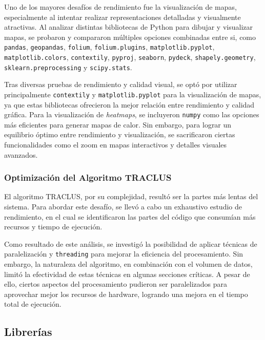 Uno de los mayores desafíos de rendimiento fue la visualización de mapas, especialmente al intentar realizar representaciones detalladas y visualmente atractivas. Al analizar distintas bibliotecas de Python para dibujar y visualizar mapas, se probaron y compararon múltiples opciones combinadas entre si, como \texttt{pandas}, \texttt{geopandas}, \texttt{folium}, \texttt{folium.plugins}, \texttt{matplotlib.pyplot}, \texttt{matplotlib.colors}, \texttt{contextily}, \texttt{pyproj}, \texttt{seaborn}, \texttt{pydeck}, \texttt{shapely.geometry}, \texttt{sklearn.preprocessing} y \texttt{scipy.stats}.

Tras diversas pruebas de rendimiento y calidad visual, se optó por utilizar principalmente \texttt{contextily} y \texttt{matplotlib.pyplot} para la visualización de mapas, ya que estas bibliotecas ofrecieron la mejor relación entre rendimiento y calidad gráfica. Para la visualización de \textit{heatmaps}, se incluyeron \texttt{numpy} como las opciones más eficientes para generar mapas de calor. Sin embargo, para lograr un equilibrio óptimo entre rendimiento y visualización, se sacrificaron ciertas funcionalidades como el zoom en mapas interactivos y detalles visuales avanzados.

\subsubsection{Optimización del Algoritmo TRACLUS}

El algoritmo TRACLUS, por su complejidad, resultó ser la partes más lentas del sistema. Para abordar este desafío, se llevó a cabo un exhaustivo estudio de rendimiento, en el cual se identificaron las partes del código que consumían más recursos y tiempo de ejecución.

Como resultado de este análisis, se investigó la posibilidad de aplicar técnicas de paralelización y \texttt{threading} para mejorar la eficiencia del procesamiento. Sin embargo, la naturaleza del algoritmo, en combinación con el volumen de datos, limitó la efectividad de estas técnicas en algunas secciones críticas. A pesar de ello, ciertos aspectos del procesamiento pudieron ser paralelizados para aprovechar mejor los recursos de hardware, logrando una mejora en el tiempo total de ejecución.

\subsection{Librerías}

